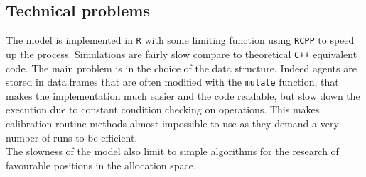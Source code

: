 \documentclass[a4paper,twoside, justified,marginals=raggedright, nobib]{tufte-handout}
\begin{document}
\subsection{Technical problems}

The model is implemented in \texttt{R} with some limiting function using \texttt{RCPP} to speed up the process. Simulations are fairly slow compare to theoretical \texttt{C++} equivalent code. The main problem is in the choice of the data structure. Indeed agents are stored in data.frames that are often modified with the \verb|mutate| function, that makes the implementation much easier and the code readable, but slow down the execution due to constant condition checking on operations. This makes calibration routine methods almost impossible to use as they demand a very number of runs to be efficient.\\
\indent The slowness of the model also limit to simple algorithms for the research of favourable positions in the allocation space.
%
%
%
%
\end{document}
